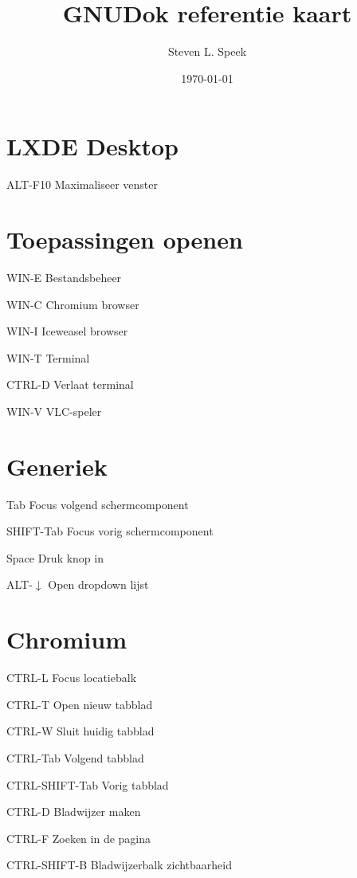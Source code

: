 \documentclass[10pt]{article}
\title{GNUDok referentie kaart}
\author{Steven L. Speek}
\date{\today{}}
\renewcommand{\maketitle}{%
{\begin{center}\Large \mythetitle\end{center}}
}
\begin{document}
\begin{multicols}{3}
	\maketitle

	\section{LXDE Desktop}
	\begin{ttdesc}[labelwidth=\widthof{\texttt{ALT-F10}}]
	\item[ALT-F10] Maximaliseer venster
	\end{ttdesc}
	\section{Toepassingen openen}
	\begin{ttdesc}[labelwidth=\widthof{\texttt{WIN-SHIFT+E}}]
	\item[WIN-E] Bestandsbeheer
	\item[WIN-C] Chromium browser
	\item[WIN-I] Iceweasel browser
	\item[WIN-T] Terminal
	\item[CTRL-D] Verlaat terminal
	\item[WIN-V] VLC-speler
	\end{ttdesc}
	\section{Generiek}
	\begin{ttdesc}[labelwidth=\widthof{\texttt{SHIFT+Tab}}]
	\item[Tab] Focus volgend schermcomponent
	\item[SHIFT-Tab] Focus vorig schermcomponent
	\item[Space] Druk knop in
	\item[ALT-$\downarrow$] Open dropdown lijst
	\end{ttdesc}
	\section{Chromium}
	\begin{ttdesc}[labelwidth=\widthof{\texttt{CTRL+SHIFT-Tab}}]
	\item[CTRL-L] Focus locatiebalk
	\item[CTRL-T] Open nieuw tabblad
	\item[CTRL-W] Sluit huidig tabblad
	\item[CTRL-Tab] Volgend tabblad
	\item[CTRL-SHIFT-Tab] Vorig tabblad
	\item[CTRL-D] Bladwijzer maken
	\item[CTRL-F] Zoeken in de pagina
	\item[CTRL-SHIFT-B] Bladwijzerbalk zichtbaarheid
	\end{ttdesc}

\end{multicols}
\end{document}
